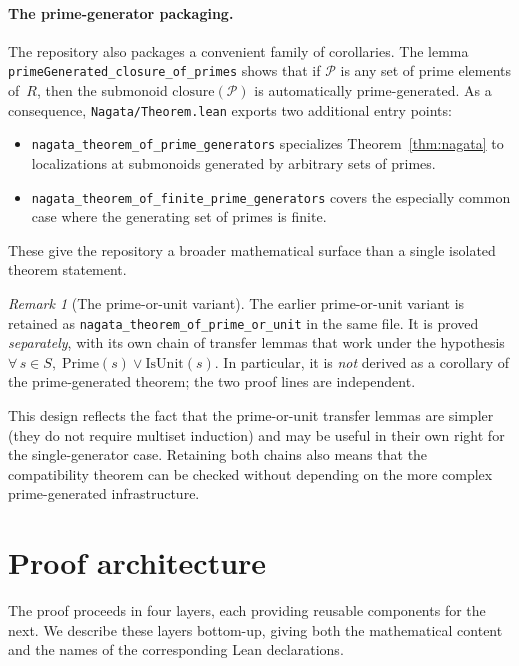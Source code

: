 \documentclass[11pt]{article}
\theoremstyle{plain}
\theoremstyle{definition}
\theoremstyle{remark}
\newtheorem{remark}[theorem]{Remark}
\newcommand{\li}[1]{\texorpdfstring{\texttt{#1}}{#1}}
\newcommand{\lf}[1]{\texorpdfstring{\nolinkurl{#1}}{#1}}
\begin{document}
\paragraph{The prime-generator packaging.}
The repository also packages a convenient family of corollaries.  The lemma
\li{primeGenerated\_closure\_of\_primes} shows that if $\mathcal{P}$ is any
set of prime elements of~$R$, then the submonoid
$\mathrm{closure}(\mathcal{P})$ is automatically prime-generated.
As a consequence, \lf{Nagata/Theorem.lean} exports two additional entry points:
\begin{itemize}[nosep]
\item \li{nagata\_theorem\_of\_prime\_generators} specializes
  Theorem~\ref{thm:nagata} to localizations at submonoids generated by
  arbitrary sets of primes.
\item \li{nagata\_theorem\_of\_finite\_\allowbreak{}prime\_generators} covers the
  especially common case where the generating set of primes is finite.
\end{itemize}
These give the repository a broader mathematical surface than a single
isolated theorem statement.

\begin{remark}[The prime-or-unit variant]\label{rem:prime-or-unit}
The earlier prime-or-unit variant is retained as
\li{nagata\_theorem\_of\_prime\_or\_unit} in the same file.  It is proved
\emph{separately}, with its own chain of transfer lemmas that work under the
hypothesis $\forall\,s\in S,\;\mathrm{Prime}(s)\lor\mathrm{IsUnit}(s)$.  In
particular, it is \emph{not} derived as a corollary of the prime-generated
theorem; the two proof lines are independent.

This design reflects the fact that the prime-or-unit transfer lemmas are
simpler (they do not require multiset induction) and may be useful in their own
right for the single-generator case.  Retaining both chains also means that the
compatibility theorem can be checked without depending on the more complex
prime-generated infrastructure.
\end{remark}


\section{Proof architecture}\label{sec:architecture}

The proof proceeds in four layers, each providing reusable components for the
next.  We describe these layers bottom-up, giving both the mathematical content
and the names of the corresponding Lean declarations.
\end{document}
